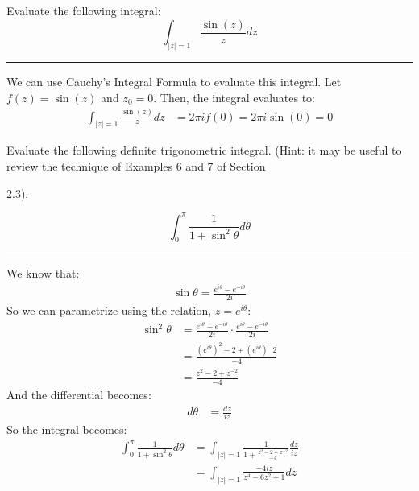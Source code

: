 \begin{example}
    Evaluate the following integral:
    $$\int_{|z|=1}\frac{\sin(z)}zdz$$

    \hrule
    \vspace{0.5cm}

    We can use Cauchy's Integral Formula to evaluate this integral. Let $f(z) = \sin(z)$ and $z_0 = 0$. Then, the integral evaluates to:
    \begin{align*}
        \int_{|z|=1}\frac{\sin(z)}zdz & = 2\pi i f(0) = 2\pi i \sin(0) = 0
    \end{align*}
\end{example}

\begin{example}

    Evaluate the following definite trigonometric integral. (Hint: it may be useful to review the technique of Examples 6 and 7 of Section

    2.3).

    $$\int_0^\pi\frac1{1+\sin^2\theta}d\theta $$

    \hrule
    \vspace{0.5cm}

    We know that:
    \begin{align*}
        \sin\theta = \frac{e^{i\theta} - e^{-i\theta}}{2i}
    \end{align*}
    So we can parametrize using the relation, $z = e^{i\theta}$:
    \begin{align*}
        \sin^2\theta & = \frac{e^{i\theta} - e^{-i\theta}}{2i} \cdot \frac{e^{i\theta} - e^{-i\theta}}{2i} \\
                     & = \frac{(e^{i\theta})^2 - 2 + (e^{i\theta})^-2}{-4}                                 \\
                     & = \frac{z^2 - 2 + z^{-2}}{-4}
    \end{align*}
    And the differential becomes:
    \begin{align*}
        d\theta & = \frac{dz}{iz}
    \end{align*}
    So the integral becomes:
    \begin{align*}
        \int_0^\pi\frac1{1+\sin^2\theta}d\theta & = \int_{|z|=1}\frac{1}{1 + \frac{z^2 - 2 + z^{-2}}{-4}} \frac{dz}{iz} \\
                                                & = \int_{|z|=1}\frac{-4iz}{z^4 - 6z^2 + 1} dz
    \end{align*}


\end{example}
